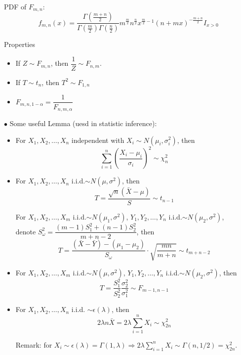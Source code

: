 \documentclass[11pt,a4paper]{ctexart}
\numberwithin{equation}{section}%
\begin{document}
\begin{itemize}
            PDF of $F_{m,n}$:
            \[
                f_{m,n}(x)=\frac{\Gamma(\frac{m+n}{2})}{\Gamma(\frac{m}{2})\Gamma(\frac{n}{2})}m^\frac{m}{2}n^{\frac{n}{2}}x^{\frac{m}{2}-1}(n+mx)^{-\frac{m+n}{2}} I_{x>0}
            \]

            Properties
            \begin{itemize}
                \item If $Z\sim F_{m,n}$, then $\dfrac{1}{Z}\sim F_{n,m}$.
                \item If $T\sim t_n$, then $T^2\sim F_{1,n}$
                \item $F_{m,n,1-\alpha}=\dfrac{1}{F_{n,m,\alpha}}$
            \end{itemize}
        \end{itemize}

        $\bullet$ Some useful Lemma (uesd in statistic inference):
        \begin{itemize}
            \item For $X_1,X_2,\ldots,X_n$ independent with $X_i\sim N(\mu_i,\sigma^2_i)$, then
            \[
                \sum_{i=1}^n\left(\frac{X_i-\mu_i}{\sigma_i}\right)^2\sim \chi^2_n
            \]  
            \item For $X_1,X_2,\ldots,X_n$ i.i.d.$\sim N(\mu,\sigma^2)$, then
            \[
                T=\frac{\sqrt{n}(\bar{X}-\mu)}{S}\sim t_{n-1}   
            \]
            
            For $X_1,X_2,\ldots,X_m$ i.i.d.$\sim N(\mu_1,\sigma^2)$, $Y_1,Y_2,\ldots,Y_n$ i.i.d.$\sim N(\mu_2,\sigma^2)$, \\ denote $S_{\omega}^2=\dfrac{(m-1)S^2_1+(n-1)S^2_2}{m+n-2}$, then
            \[
                T=\frac{(\bar{X}-\bar{Y})-(\mu_1-\mu_2)}{S_{\omega}}\cdot \sqrt{\frac{mn}{m+n}}\sim t_{m+n-2}
            \]
            \item For $X_1,X_2,\ldots,X_m$ i.i.d.$\sim N(\mu,\sigma^2)$, $Y_1,Y_2,\ldots,Y_n$ i.i.d.$\sim N(\mu_2,\sigma^2)$, then
            \[
                T=\frac{S_1^2}{S_2^2}\frac{\sigma^2_2}{\sigma^2_1}\sim F_{m-1,n-1}   
            \]
            \item For $X_1,X_2,\ldots,X_n$ i.i.d. $\sim \epsilon(\lambda)$, then
            \[
                2\lambda n\bar{X}=2\lambda\sum_{i=1}^nX_i \sim\chi^2_{2n} 
            \]

            Remark: for $X_i\sim\epsilon(\lambda)=\Gamma(1,\lambda)\Rightarrow 2\lambda\sum_{i=1}^nX_i\sim\Gamma(n,1/2)=\chi^2_{2n}$. 
        \end{itemize}
\end{document}
